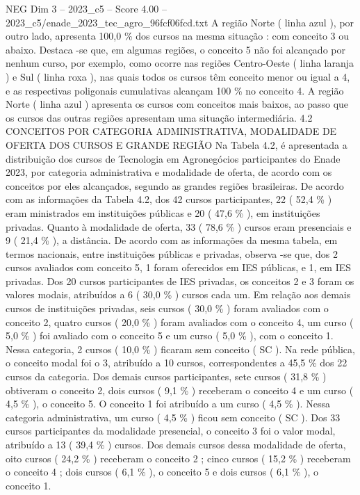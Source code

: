 \begin{textsample}{NEG Dim 3 – 2023\_c5 – Score 4.00 – 2023\_c5/enade\_2023\_tec\_agro\_96fcf06fcd.txt}
A região Norte ( linha azul ), por outro lado, apresenta 100,0 \% dos cursos na mesma situação : com conceito 3 ou abaixo.
Destaca -se que, em algumas regiões, o conceito 5 não foi alcançado por nenhum curso, por exemplo, como ocorre nas regiões Centro-Oeste ( linha laranja ) e Sul ( linha roxa ), nas quais todos os cursos têm conceito menor ou igual a 4, e as respectivas poligonais cumulativas alcançam 100 \% no conceito 4.
A região Norte ( linha azul ) apresenta os cursos com conceitos mais baixos, ao passo que os cursos das outras regiões apresentam uma situação intermediária. 4.2 CONCEITOS POR CATEGORIA ADMINISTRATIVA, MODALIDADE DE OFERTA DOS CURSOS E GRANDE REGIÃO Na Tabela 4.2, é apresentada a distribuição dos cursos de Tecnologia em Agronegócios participantes do Enade 2023, por categoria administrativa e modalidade de oferta, de acordo com os conceitos por eles alcançados, segundo as grandes regiões brasileiras.
De acordo com as informações da Tabela 4.2, dos 42 cursos participantes, 22 ( 52,4 \% ) eram ministrados em instituições públicas e 20 ( 47,6 \% ), em instituições privadas.
Quanto à modalidade de oferta, 33 ( 78,6 \% ) cursos eram presenciais e 9 ( 21,4 \% ), a distância.
De acordo com as informações da mesma tabela, em termos nacionais, entre instituições públicas e privadas, observa -se que, dos 2 cursos avaliados com conceito 5, 1 foram oferecidos em IES públicas, e 1, em IES privadas.
Dos 20 cursos participantes de IES privadas, os conceitos 2 e 3 foram os valores modais, atribuídos a 6 ( 30,0 \% ) cursos cada um.
Em relação aos demais cursos de instituições privadas, seis cursos ( 30,0 \% ) foram avaliados com o conceito 2, quatro cursos ( 20,0 \% ) foram avaliados com o conceito 4, um curso ( 5,0 \% ) foi avaliado com o conceito 5 e um curso ( 5,0 \% ), com o conceito 1.
Nessa categoria, 2 cursos ( 10,0 \% ) ficaram sem conceito ( SC ).
Na rede pública, o conceito modal foi o 3, atribuído a 10 cursos, correspondentes a 45,5 \% dos 22 cursos da categoria.
Dos demais cursos participantes, sete cursos ( 31,8 \% ) obtiveram o conceito 2, dois cursos ( 9,1 \% ) receberam o conceito 4 e um curso ( 4,5 \% ), o conceito 5.
O conceito 1 foi atribuído a um curso ( 4,5 \% ).
Nessa categoria administrativa, um curso ( 4,5 \% ) ficou sem conceito ( SC ).
Dos 33 cursos participantes da modalidade presencial, o conceito 3 foi o valor modal, atribuído a 13 ( 39,4 \% ) cursos.
Dos demais cursos dessa modalidade de oferta, oito cursos ( 24,2 \% ) receberam o conceito 2 ; cinco cursos ( 15,2 \% ) receberam o conceito 4 ; dois cursos ( 6,1 \% ), o conceito 5 e dois cursos ( 6,1 \% ), o conceito 1.

\end{textsample}
